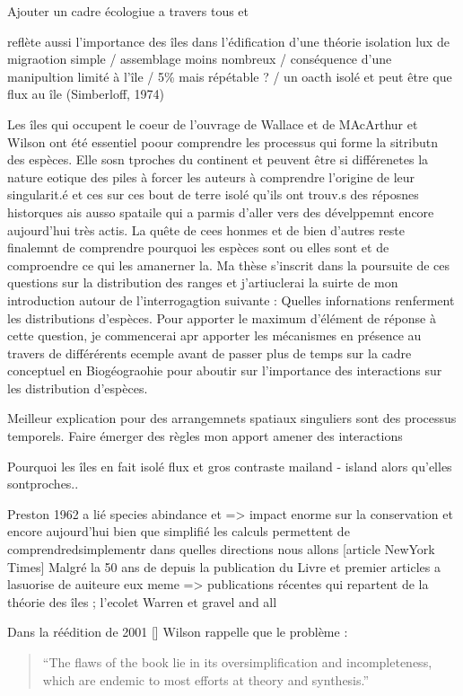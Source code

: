Ajouter un cadre écologiue a travers tous et

reflète aussi l'importance des îles dans l'édification d'une théorie
isolation lux de migraotion simple / assemblage moins nombreux /
conséquence d'une manipultion limité à l'île / 5\% mais répétable ? / un
oacth isolé et peut être que flux au île (Simberloff, 1974)

Les îles qui occupent le coeur de l'ouvrage de Wallace et de MAcArthur
et Wilson ont été essentiel poour comprendre les processus qui forme la
sitributn des espèces. Elle sosn tproches du continent et peuvent être
si différenetes la nature eotique des piles à forcer les auteurs à
comprendre l'origine de leur singularit.é et ces sur ces bout de terre
isolé qu'ils ont trouv.s des réposnes historques ais ausso spataile qui
a parmis d'aller vers des dévelppemnt encore aujourd'hui très actis. La
quête de cees honmes et de bien d'autres reste finalemnt de comprendre
pourquoi les espèces sont ou elles sont et de comproendre ce qui les
amanerner la. Ma thèse s'inscrit dans la poursuite de ces questions sur
la distribution des ranges et j'artiuclerai la suirte de mon
introduction autour de l'interrogagtion suivante : Quelles infornations
renferment les distributions d'espèces. Pour apporter le maximum
d'élément de réponse à cette question, je commencerai apr apporter les
mécanismes en présence au travers de différérents ecemple avant de
passer plus de temps sur la cadre conceptuel en Biogéograohie pour
aboutir sur l'importance des interactions sur les distribution
d'espèces.

Meilleur explication pour des arrangemnets spatiaux singuliers sont des
processus temporels. Faire émerger des règles mon apport amener des
interactions

Pourquoi les îles en fait isolé flux et gros contraste mailand - island
alors qu'elles sontproches..

Preston 1962 a lié species abindance et =\textgreater{} impact enorme
sur la conservation et encore aujourd'hui bien que simplifié les calculs
permettent de comprendredsimplementr dans quelles directions nous allons
{[}article NewYork Times{]} Malgré la 50 ans de depuis la publication du
Livre et premier articles a lasuorise de auiteure eux meme
=\textgreater{} publications récentes qui repartent de la théorie des
îles ; l'ecolet Warren et gravel and all

Dans la réédition de 2001 {[}{]} Wilson rappelle que le problème :

\begin{quote}
``The flaws of the book lie in its oversimplification and
incompleteness, which are endemic to most efforts at theory and
synthesis.''
\end{quote}

